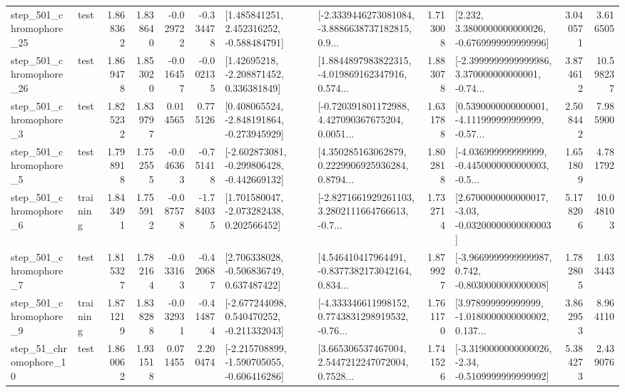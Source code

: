 \begin{tabular}{llrrrrllrlrr}
  step\_501\_chromophore\_25 &      test &      1.868362 &    1.838640 &     -0.029722 & -0.334478 &    [1.485841251, 2.452316252, -0.588484791] &  [-2.3339446273081084, -3.8886638737182815, 0.9... &       1.713008 &   [2.232, 3.3800000000000026, -0.6769999999999996] &            3.040571 &          3.616505 \\
  step\_501\_chromophore\_26 &      test &      1.869478 &    1.853020 &     -0.016457 & -0.002135 &     [1.42695218, -2.208871452, 0.336381849] &  [1.8844897983822315, -4.019869162347916, 0.574... &       1.883078 &  [-2.3999999999999986, 3.370000000000001, -0.74... &            3.874612 &         10.598237 \\
   step\_501\_chromophore\_3 &      test &      1.825232 &    1.839797 &      0.014565 &  0.775126 &   [0.408065524, -2.848191864, -0.273945929] &  [-0.720391801172988, 4.427090367675204, 0.0051... &       1.631788 &  [0.5390000000000001, -4.111999999999999, -0.57... &            2.508442 &          7.985900 \\
   step\_501\_chromophore\_5 &      test &      1.798918 &    1.752555 &     -0.046363 & -0.751418 &  [-2.602873081, -0.299806428, -0.442669132] &  [4.350285163062879, 0.2229906925936284, 0.8794... &       1.802818 &  [-4.036999999999999, -0.4450000000000003, -0.5... &            1.651809 &          4.781792 \\
   step\_501\_chromophore\_6 &  training &      1.843491 &    1.755912 &     -0.087578 & -1.784035 &    [1.701580047, -2.073282438, 0.202566452] &  [-2.8271661929261103, 3.2802111664766613, -0.7... &       1.732714 &  [2.6700000000000017, -3.03, -0.03200000000000003] &            5.178206 &         10.048103 \\
   step\_501\_chromophore\_7 &      test &      1.815327 &    1.782164 &     -0.033163 & -0.420687 &    [2.706338028, -0.506836749, 0.637487422] &  [4.546410417964491, -0.8377382173042164, 0.834... &       1.879927 &  [-3.9669999999999987, 0.742, -0.8030000000000008] &            1.782805 &          1.033443 \\
   step\_501\_chromophore\_9 &  training &      1.871219 &    1.838288 &     -0.032931 & -0.414874 &   [-2.677244098, 0.540470252, -0.211332043] &  [-4.333346611998152, 0.7743831298919532, -0.76... &       1.761170 &  [3.978999999999999, -1.0180000000000002, 0.137... &            3.862953 &          8.964110 \\
   step\_51\_chromophore\_10 &      test &      1.860062 &    1.931518 &      0.071455 &  2.200474 &  [-2.215708899, -1.590705055, -0.606416286] &  [3.665306537467004, 2.5447212247072004, 0.7528... &       1.741526 &  [-3.3190000000000026, -2.34, -0.5109999999999992] &            5.384273 &          2.439076 \\

\end{tabular}
